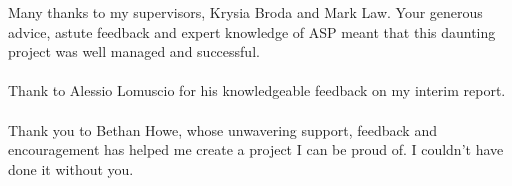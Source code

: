 \newpage\null\thispagestyle{empty}\newpage
\let\cleardoublepage\clearpage
{}

\begin{acknowledgements}
Many thanks to my supervisors, Krysia Broda and Mark Law. Your generous advice, astute feedback and expert knowledge of ASP meant that this daunting project was well managed and successful. \\ \\
Thank to Alessio Lomuscio for his knowledgeable feedback on my interim report. \\ \\
Thank you to Bethan Howe, whose unwavering support, feedback and encouragement has helped me create a project I can be proud of. I couldn't have done it without you.

\end{acknowledgements}